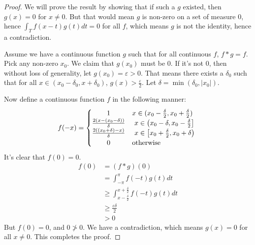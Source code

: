 \documentclass[12pt, titlepage]{article}
\theoremstyle{definition}
\newcommand{\vep}{\varepsilon}
\begin{document}
\begin{proof}
    We will prove the result by showing that if such a $g$ existed, then $g(x) = 0$ for $x \neq 0$. But that would mean $g$ is non-zero on a set of measure $0$, hence $\int_T f(x-t) g(t) dt = 0$ for all $f$, which means $g$ is not the identity, hence a contradiction.
    
    Assume we have a continuous function $g$ such that for all continuous $f$, $f \ast g = f$. Pick any non-zero $x_0$. We claim that $g(x_0)$ must be $0$. If it's not $0$, then without loss of generality, let $g(x_0) = \vep > 0$. That means there exists a $\delta_0$ such that for all $x \in (x_0 - \delta_0, x+ \delta_0)$, $g(x) > \frac{\vep}{2}$. Let $\delta = \min(\delta_0, |x_0|)$.
    
    Now define a continuous function $f$ in the following manner:
    \begin{align*}
        f(-x) =
        \begin{cases} 
        \hfill 1    \hfill & \text{$x \in (x_0 - \frac{\delta}{2}, x_0 + \frac{\delta}{2})$ } \\
        \hfill \frac{2(x - (x_0-\delta))}{\delta} \hfill & \text{ $x \in \left( x_0 - \delta, x_0 - \frac{\delta}{2} \right]$ } \\
        \hfill \frac{2((x_0+\delta) - x)}{\delta} \hfill & \text{ $x \in \left[ x_0 + \frac{\delta}{2}, x_0 + \delta \right)$ } \\
        \hfill 0 \hfill & \text{otherwise}
        \end{cases}
    \end{align*}
    It's clear that $f(0) = 0$.
    \begin{align*}
        f(0) &= (f \ast g)(0) \\
             &= \int_{-\pi}^{\pi} f(-t) g(t) dt \\
             &\geq \int_{x - \frac{\delta}{2}}^{x + \frac{\delta}{2}} f(-t) g(t) dt \\
             &\geq \frac{\vep \delta}{2} \\
             &> 0
    \end{align*}
    But $f(0) = 0$, and $0 \not > 0$. We have a contradiction, which means $g(x) = 0$ for all $x \neq 0$. This completes the proof.
\end{proof}
\end{document}
